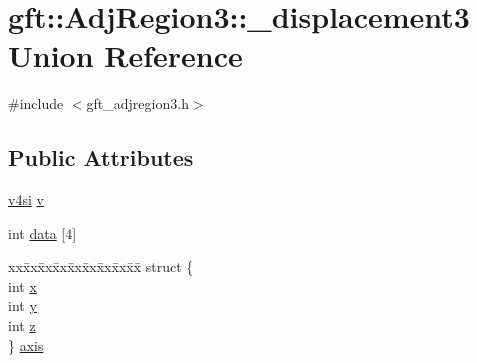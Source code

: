 \hypertarget{uniongft_1_1AdjRegion3_1_1__displacement3}{\section{gft\-:\-:Adj\-Region3\-:\-:\-\_\-displacement3 Union Reference}
\label{uniongft_1_1AdjRegion3_1_1__displacement3}
}


{\ttfamily \#include $<$gft\-\_\-adjregion3.\-h$>$}

\subsection*{Public Attributes}
\begin{DoxyCompactItemize}
\item 
\hyperlink{namespacegft_aba3889d81ba015326f093206316745b7}{v4si} \hyperlink{uniongft_1_1AdjRegion3_1_1__displacement3_a29fc6fe36e0937fd715c0f394f1e8e87}{v}
\item 
int \hyperlink{uniongft_1_1AdjRegion3_1_1__displacement3_ae2fabfae5afcbee10f5d7f0f8bf4b40c}{data} \mbox{[}4\mbox{]}
\item 
\begin{tabbing}
xx\=xx\=xx\=xx\=xx\=xx\=xx\=xx\=xx\=\kill
struct \{\\
\>int \hyperlink{uniongft_1_1AdjRegion3_1_1__displacement3_a3d9a90de02004c91413b6dccdce2af03}{x}\\
\>int \hyperlink{uniongft_1_1AdjRegion3_1_1__displacement3_ae5f88f74ade7acc6cc97a8ba8537a8c8}{y}\\
\>int \hyperlink{uniongft_1_1AdjRegion3_1_1__displacement3_a05b4db47be0e60b35bf377f9af225edf}{z}\\
\} \hyperlink{uniongft_1_1AdjRegion3_1_1__displacement3_a0e0bf1a65fe30a11c45436c8e23a025d}{axis}\\

\end{tabbing}\end{DoxyCompactItemize}



